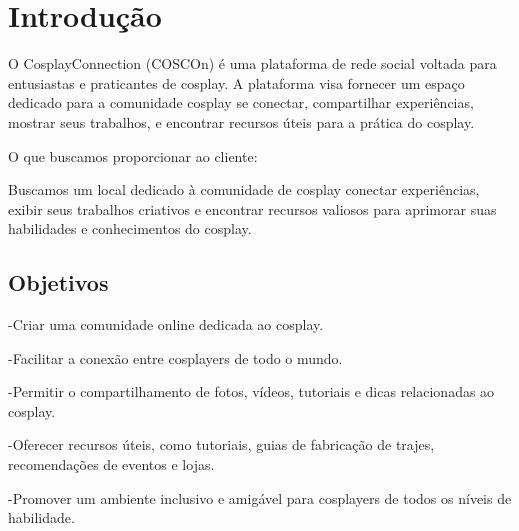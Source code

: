\documentclass[12pt,a4paper,chapter=TITLE,section=TITLE,subsection=TITLE,subsubsection=TITLE]{article}
\begin{document}



\textual

\section{Introdução}
O CosplayConnection (COSCOn) é uma plataforma de rede social voltada para entusiastas e praticantes de cosplay. A plataforma visa fornecer um espaço dedicado para a comunidade cosplay se conectar, compartilhar experiências, mostrar seus trabalhos, e encontrar recursos úteis para a prática do cosplay.

O que buscamos proporcionar ao cliente:
    \begin{citacao}
   Buscamos um local dedicado à comunidade de cosplay conectar experiências, exibir seus trabalhos criativos e encontrar recursos valiosos para aprimorar suas habilidades e conhecimentos do cosplay.
    \end{citacao}

\subsection{Objetivos}

-Criar uma comunidade online dedicada ao cosplay.

-Facilitar a conexão entre cosplayers de todo o mundo.

-Permitir o compartilhamento de fotos, vídeos, tutoriais e dicas relacionadas ao cosplay.

-Oferecer recursos úteis, como tutoriais, guias de fabricação de trajes, recomendações de eventos e lojas.

-Promover um ambiente inclusivo e amigável para cosplayers de todos os níveis de habilidade.
\end{document}
